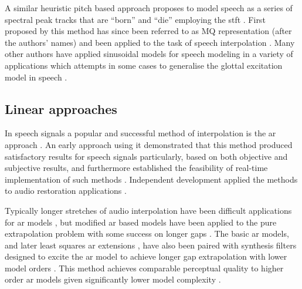 A similar heuristic pitch based approach proposes to model speech as a series of spectral peak tracks that are ``born'' and ``die'' employing the \gls{stft} \cite{Maher1994}. First proposed by \cite{McAulay1986} this method has since been referred to as MQ representation (after the authors' names) and been applied to the task of speech interpolation \cite{Maher1994}. Many other authors have applied sinusoidal models for speech modeling in a variety of applications \cite{Godsill1998book}\cite{Vera-Candeas2003}\cite{Wells2006} which attempts in some cases to generalise the glottal excitation model in speech \cite{McAulay1986}.


\subsection{Linear approaches}\label{sec:LitRev_RestorationLin}

In speech signals a popular and successful method of interpolation is the \gls{ar} approach \cite{Vaseghi1988thesis}\cite{Godsill1998book}\cite{Kauppinen2002b}. An early approach using it demonstrated that this method produced satisfactory results for speech signals particularly, based on both objective and subjective results, and furthermore established the feasibility of real-time implementation of such methods \cite{Janssen1986}. Independent development applied the methods to audio restoration applications \cite{Vaseghi1988thesis}\cite{Vaseghi1990}.

Typically longer stretches of audio interpolation have been difficult applications for \gls{ar} models \cite{Veldhuis1992}\cite{Kauppinen2002b}, but modified \gls{ar} based models have been applied to the pure extrapolation problem with some success on longer gaps \cite{Kauppinen2002b}. The basic \gls{ar} models, and later least squares \gls{ar} extensions \cite{Godsill1998book}, have also been paired with synthesis filters designed to excite the \gls{ar} model to achieve longer gap extrapolation with lower model orders \cite{Esquef2006}. This method achieves comparable perceptual quality to higher order \gls{ar} models given significantly lower model complexity \cite{Esquef2006}.

